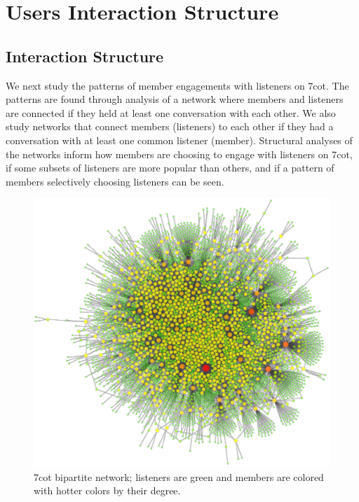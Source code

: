 \chapter{Users Interaction Structure}
\section{Interaction Structure}
We next study the patterns of member engagements with listeners on 7cot. 
The patterns are found through analysis of a network where members and listeners
are connected if they held at least one conversation with each other. 
We also study networks that connect members (listeners) 
to each other if they had a conversation with at least one common listener
(member).  Structural analyses of the networks inform how members are 
choosing to engage with listeners on 7cot, if some subsets of listeners
are more popular than others, and if a pattern of members selectively 
choosing listeners can be seen.

\begin{figure}
	\includegraphics[width=\textwidth]{bpn.pdf}
	\caption{7cot bipartite network; listeners are green and members are colored with 
		hotter colors by their degree.}
	\label{fig:bpn}
\end{figure}

